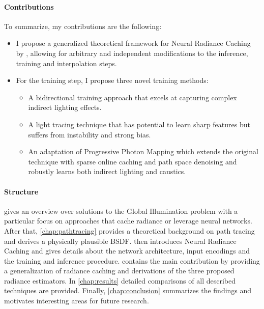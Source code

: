 \paragraph{Contributions} To summarize, my contributions are the following:
\begin{itemize}
    \item I propose a generalized theoretical framework for Neural Radiance Caching by \textcite{muller2021}, allowing for arbitrary and independent modifications to the inference, training and interpolation steps.
    \item For the training step, I propose three novel training methods:
    \begin{itemize}
        \item A bidirectional training approach that excels at capturing complex indirect lighting effects.
        \item A light tracing technique that has potential to learn sharp features but suffers from instability and strong bias.
        \item An adaptation of Progressive Photon Mapping \parencite{jensen1996,hachisuka2008} which extends the original technique with sparse online caching and path space denoising and robustly learns both indirect lighting and caustics.
    \end{itemize}
\end{itemize}

\paragraph{Structure}  gives an overview over solutions to the Global Illumination problem with a particular focus on approaches that cache radiance or leverage neural networks.
After that, \cref{chap:pathtracing} provides a theoretical background on path tracing and derives a physically plausible BSDF.
 then introduces Neural Radiance Caching and gives details about the network architecture, input encodings and the training and inference procedure.
 contains the main contribution by providing a generalization of radiance caching and derivations of the three proposed radiance estimators.
In \cref{chap:results} detailed comparisons of all described techniques are provided.
Finally, \cref{chap:conclusion} summarizes the findings and motivates interesting areas for future research.
